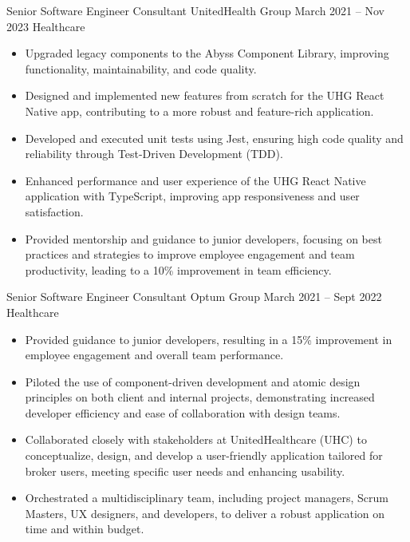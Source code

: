 \cvexperience
{Senior Software Engineer Consultant}
{UnitedHealth Group}
{March 2021 – Nov 2023}
{Healthcare}
{\footnotesize\faCode \hspace{.5pt}        }
\begin{itemize}
    \item Upgraded legacy components to the Abyss Component Library, improving functionality, maintainability, and code quality.
    \item Designed and implemented new features from scratch for the UHG React Native app, contributing to a more robust and feature-rich application.
    \item Developed and executed unit tests using Jest, ensuring high code quality and reliability through Test-Driven Development (TDD).
    \item Enhanced performance and user experience of the UHG React Native application with TypeScript, improving app responsiveness and user satisfaction.
    \item Provided mentorship and guidance to junior developers, focusing on best practices and strategies to improve employee engagement and team productivity, leading to a 10\% improvement in team efficiency.
\end{itemize}

\medskip

\cvexperience
{Senior Software Engineer Consultant}
{Optum Group}
{March 2021 – Sept 2022}
{Healthcare}
{\footnotesize\faCode \hspace{1pt}      }
\begin{itemize}
    \item Provided guidance to junior developers, resulting in a 15\% improvement in employee engagement and overall team performance.
    \item Piloted the use of component-driven development and atomic design principles on both client and internal projects, demonstrating increased developer efficiency and ease of collaboration with design teams.
    \item Collaborated closely with stakeholders at UnitedHealthcare (UHC) to conceptualize, design, and develop a user-friendly application tailored for broker users, meeting specific user needs and enhancing usability.
    \item Orchestrated a multidisciplinary team, including project managers, Scrum Masters, UX designers, and developers, to deliver a robust application on time and within budget.
\end{itemize}

